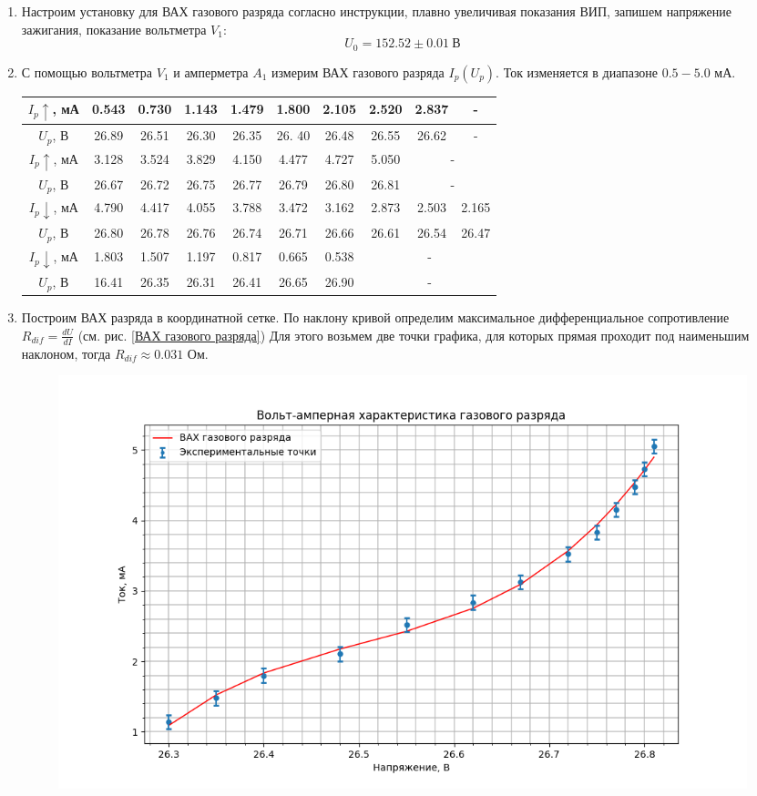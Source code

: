 \documentclass[a4paper, 12pt]{article}
\begin{document}
\begin{enumerate}
    \item Настроим установку для ВАХ газового разряда согласно инструкции, плавно увеличивая показания ВИП, запишем напряжение
    зажигания, показание вольтметра $V_{1}$:
    \begin{equation}
        U_{0} = 152.52\pm 0.01\ \text{В}
    \end{equation}
    \item С помощью вольтметра $V_{1}$ и амперметра $A_{1}$ измерим ВАХ газового разряда $I_{p}(U_{p})$. Ток изменяется в диапазоне $0.5 - 5.0$ мА.
    \begin{table}[htbp]
        \centering
        \begin{tabular}{|c|c|c|c|c|c|c|c|c|c|}
            \hline
            $I_{p}\uparrow$, мА & 0.543 & 0.730 & 1.143 & 1.479 & 1.800 & 2.105 & 2.520 & 2.837 & -\\ \hline
            $U_{p}$, В & 26.89 & 26.51 & 26.30 & 26.35 & 26. 40 & 26.48 & 26.55 & 26.62 & -\\ \hline
            $I_{p}\uparrow$, мА & 3.128 & 3.524 & 3.829 & 4.150 & 4.477 & 4.727 & 5.050 & \multicolumn{2}{|c|}{-}\\ \hline
            $U_{p}$, В & 26.67 & 26.72 & 26.75 & 26.77 & 26.79 & 26.80 & 26.81 & \multicolumn{2}{|c|}{-}\\ \hline
            $I_{p}\downarrow$, мА & 4.790 & 4.417 & 4.055 & 3.788 & 3.472 & 3.162 & 2.873 & 2.503 & 2.165\\ \hline
            $U_{p}$, В & 26.80 & 26.78 & 26.76 & 26.74 & 26.71 & 26.66 & 26.61 & 26.54 & 26.47\\ \hline
            $I_{p}\downarrow$, мА & 1.803 & 1.507 & 1.197 & 0.817 & 0.665 & 0.538 & \multicolumn{3}{|c|}{-}\\ \hline
            $U_{p}$, В & 16.41 & 26.35 & 26.31 & 26.41 & 26.65 & 26.90 & \multicolumn{3}{|c|}{-}\\
            \hline
        \end{tabular}
    \end{table}
    \item Построим ВАХ разряда в координатной сетке. По наклону кривой определим максимальное дифференциальное сопротивление $R_{dif} = \frac{dU}{dI}$ (см. рис. \ref{ВАХ газового разряда})
    Для этого возьмем две точки графика, для которых прямая проходит под наименьшим наклоном, тогда $R_{dif} \approx 0.031$ Ом.
    \begin{figure}[htbp]
        \centering
        \includegraphics[width=0.8\linewidth]{vax.png}

\end{figure}
\end{enumerate}
\end{document}
